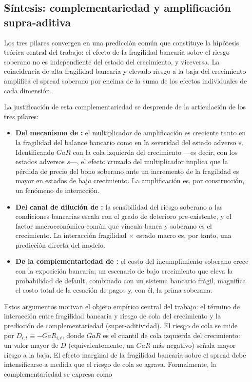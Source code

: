 \subsection{Síntesis: complementariedad y amplificación supra-aditiva}

Los tres pilares convergen en una predicción común que constituye la hipótesis teórica central del trabajo: el efecto de la fragilidad bancaria sobre el riesgo soberano no es independiente del estado del crecimiento, y viceversa. La coincidencia de alta fragilidad bancaria y elevado riesgo a la baja del crecimiento amplifica el spread soberano por encima de la suma de los efectos individuales de cada dimensión.

La justificación de esta complementariedad se desprende de la articulación de los tres pilares:

\begin{itemize}
    \item \textbf{Del mecanismo de \citet{FarhiTirole2018b}:} el multiplicador de amplificación es creciente tanto en la fragilidad del balance bancario como en la severidad del estado adverso $s$. Identificando $GaR$ con la cola izquierda del crecimiento —es decir, con los estados adversos $s$—, el efecto cruzado del multiplicador implica que la pérdida de precio del bono soberano ante un incremento de la fragilidad es mayor en estados de bajo crecimiento. La amplificación es, por construcción, un fenómeno de interacción.
    \item \textbf{Del canal de dilución de \citet{AcharyaDrechslerSchnabl2014b}:} la sensibilidad del riesgo soberano a las condiciones bancarias escala con el grado de deterioro pre-existente, y el factor macroeconómico común que vincula banca y soberano es el crecimiento. La interacción fragilidad $\times$ estado macro es, por tanto, una predicción directa del modelo.
    \item \textbf{De la complementariedad de \citet{GennaioliMartinRossi2014}:} el costo del incumplimiento soberano crece con la exposición bancaria; un escenario de bajo crecimiento que eleva la probabilidad de default, combinado con un sistema bancario frágil, magnifica el costo total de la cesación de pagos y, con él, la prima soberana.
\end{itemize}

Estos argumentos motivan el objeto empírico central del trabajo: el término de interacción entre fragilidad bancaria y riesgo de cola del crecimiento y la predicción de complementariedad (super-aditividad). El riesgo de cola se mide por $D_{i,t}\equiv-GaR_{i,t}$, donde $GaR$ es el cuantil de cola izquierda del crecimiento: un valor mayor de $D$ (equivalentemente, un $GaR$ más negativo) señala mayor riesgo a la baja. El efecto marginal de la fragilidad bancaria sobre el spread debe intensificarse a medida que el riesgo de cola se agrava. Formalmente, la complementariedad se expresa como

